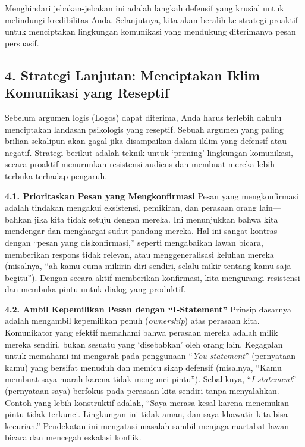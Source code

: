 \documentclass[
  letterpaper,
  DIV=11,
  numbers=noendperiod]{scrreprt}
\begin{document}
Menghindari jebakan-jebakan ini adalah langkah defensif yang krusial
untuk melindungi kredibilitas Anda. Selanjutnya, kita akan beralih ke
strategi proaktif untuk menciptakan lingkungan komunikasi yang mendukung
diterimanya pesan persuasif.

\subsection{\texorpdfstring{\textbf{4. Strategi Lanjutan: Menciptakan
Iklim Komunikasi yang
Reseptif}}{4. Strategi Lanjutan: Menciptakan Iklim Komunikasi yang Reseptif}}\label{strategi-lanjutan-menciptakan-iklim-komunikasi-yang-reseptif}

Sebelum argumen logis (Logos) dapat diterima, Anda harus terlebih dahulu
menciptakan landasan psikologis yang reseptif. Sebuah argumen yang
paling brilian sekalipun akan gagal jika disampaikan dalam iklim yang
defensif atau negatif. Strategi berikut adalah teknik untuk `priming'
lingkungan komunikasi, secara proaktif menurunkan resistensi audiens dan
membuat mereka lebih terbuka terhadap pengaruh.

\textbf{4.1. Prioritaskan Pesan yang Mengkonfirmasi} Pesan yang
mengkonfirmasi adalah tindakan mengakui eksistensi, pemikiran, dan
perasaan orang lain---bahkan jika kita tidak setuju dengan mereka. Ini
menunjukkan bahwa kita mendengar dan menghargai sudut pandang mereka.
Hal ini sangat kontras dengan ``pesan yang diskonfirmasi,'' seperti
mengabaikan lawan bicara, memberikan respons tidak relevan, atau
menggeneralisasi keluhan mereka (misalnya, ``ah kamu cuma mikirin diri
sendiri, selalu mikir tentang kamu saja begitu''). Dengan secara aktif
memberikan konfirmasi, kita mengurangi resistensi dan membuka pintu
untuk dialog yang produktif.

\textbf{4.2. Ambil Kepemilikan Pesan dengan ``I-Statement''} Prinsip
dasarnya adalah mengambil kepemilikan penuh (\emph{ownership}) atas
perasaan kita. Komunikator yang efektif memahami bahwa perasaan mereka
adalah milik mereka sendiri, bukan sesuatu yang `disebabkan' oleh orang
lain. Kegagalan untuk memahami ini mengarah pada penggunaan
``\emph{You-statement}'' (pernyataan kamu) yang bersifat menuduh dan
memicu sikap defensif (misalnya, ``Kamu membuat saya marah karena tidak
mengunci pintu''). Sebaliknya, ``\emph{I-statement}'' (pernyataan saya)
berfokus pada perasaan kita sendiri tanpa menyalahkan. Contoh yang lebih
konstruktif adalah, ``Saya merasa kesal karena menemukan pintu tidak
terkunci. Lingkungan ini tidak aman, dan saya khawatir kita bisa
kecurian.'' Pendekatan ini mengatasi masalah sambil menjaga martabat
lawan bicara dan mencegah eskalasi konflik.
\end{document}
